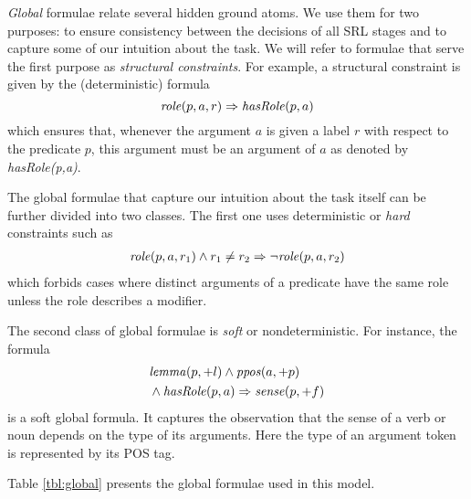 
\emph{Global} formulae relate several hidden ground atoms. We use them for two 
purposes: to ensure consistency between the decisions of all SRL stages and to 
capture some of our intuition about the task. We will refer to formulae that 
serve the first purpose as \emph{structural constraints}. For example, a 
structural constraint is given by the (deterministic) formula
\[\mathit{role}(p,a,r) \Rightarrow \mathit{hasRole}(p,a)\]
which ensures that, whenever the argument $a$ is given a label $r$ with respect 
to the predicate $p$, this argument must be an argument of $a$ as denoted by 
\emph{hasRole(p,a)}.

The global formulae that capture our intuition about the task itself can be 
further divided into two classes. The first one uses deterministic or 
\emph{hard} constraints such as
\begin{eqnarray*}
       & \mathit{role}(p,a,r_1) \wedge r_1 \neq r_2 \Rightarrow \neg \mathit{role}(p,a,r_2)\\
\end{eqnarray*}
which forbids cases where distinct arguments of a predicate have the same role 
unless the role describes a modifier.

The second class of global formulae is \emph{soft} or nondeterministic. For 
instance, the formula
\begin{eqnarray*}
  & \mathit{lemma}(p,+l) \wedge \mathit{ppos}(a,+p)  \\
  & \wedge \mathit{hasRole}(p,a)  \Rightarrow \mathit{sense}(p,+f)
  \end{eqnarray*}
is a soft global formula. It captures the observation that the sense of a verb 
or noun depends on the type of its arguments. Here the type of an argument token 
is represented by its POS tag.

Table \ref{tbl:global} presents the global formulae used in this model. 

